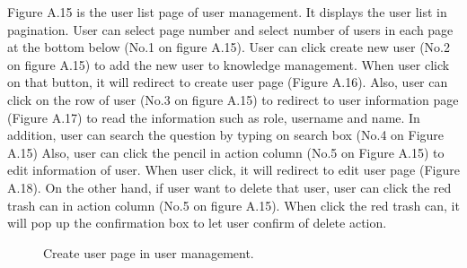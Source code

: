 \documentclass[12pt,oneside,openright,a4paper]{cpe-english-project}
\begin{document}
Figure A.15 is the user list page of user management. It displays the user list in 
pagination. User can select page number and select number of users in each page at the 
bottom below (No.1 on figure A.15).
User can click create new user (No.2 on figure A.15) to add the new user to 
knowledge management. When user click on that button, it will redirect to create user page 
(Figure A.16). Also, user can click on the row of user (No.3 on figure A.15) to redirect to 
user information page (Figure A.17) to read the information such as role, username and 
name. In addition, user can search the question by typing on search box (No.4 on Figure 
A.15)
Also, user can click the pencil in action column (No.5 on Figure A.15) to edit 
information of user. When user click, it will redirect to edit user page (Figure A.18). On the 
other hand, if user want to delete that user, user can click the red trash can in action column 
(No.5 on figure A.15). When click the red trash can, it will pop up the confirmation box to 
let user confirm of delete action. \\
\begin{figure}[!h]\centering
{}
\caption{Create user page in user management.
}\label{fig:Create user page in user management.
}
\end{figure} \\
\end{document}

